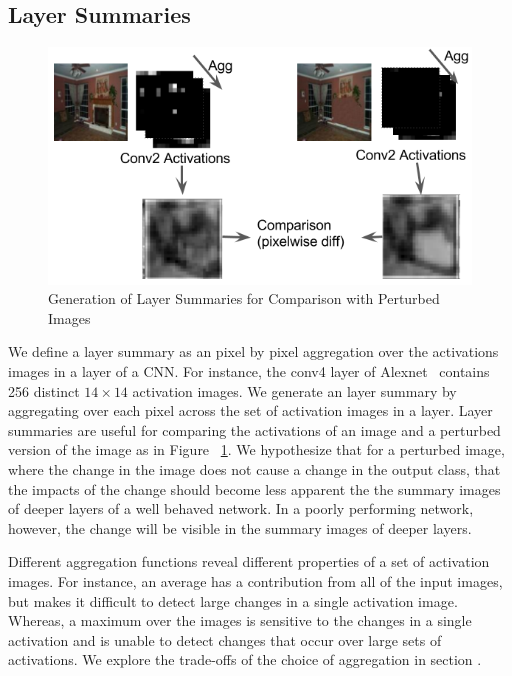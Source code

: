 \subsection{Layer Summaries}

\begin{figure}[b]
\centering
\includegraphics[width=\columnwidth]{figures/layer_summary_fig}
\caption{Generation of Layer Summaries for Comparison with Perturbed Images}

\label{fig:act_im_summary_fig}
\end{figure}

We define a layer summary as an pixel by pixel aggregation over the activations images in a layer of a CNN. For instance, the conv4 layer of Alexnet~\cite{alexnet} contains 256 distinct $14 \times 14$ activation images. We generate an layer summary by aggregating over each pixel across the set of activation images in a layer. Layer summaries are useful for comparing the activations of an image and a perturbed version of the image as in Figure ~\ref{fig:act_im_summary_fig}. We hypothesize that for a perturbed image, where the change in the image does not cause a change in the output class, that the impacts of the change should become less apparent the the summary images of deeper layers of a well behaved network. In a poorly performing network, however, the change will be visible in the summary images of deeper layers.

Different aggregation functions reveal different properties of a set of activation images. For instance, an average has a contribution from all of the input images, but makes it difficult to detect large changes in a single activation image. Whereas, a maximum over the images is sensitive to the changes in a single activation and is unable to detect changes that occur over large sets of activations. We explore the trade-offs of the choice of aggregation in section .